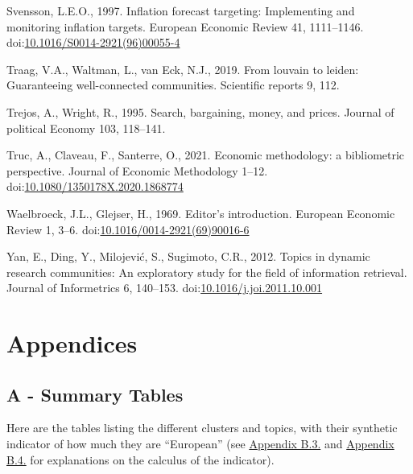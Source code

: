 \documentclass[
  12pt,
  onecolumn]{article}
\newlength{\cslhangindent}
\newlength{\cslentryspacingunit} %
\newenvironment{CSLReferences}[2] %
 {%
  \setlength{\parindent}{0pt}
  \ifodd #1
  \let\oldpar\par
  \def\par{\hangindent=\cslhangindent\oldpar}
  \fi
  \setlength{\parskip}{#2\cslentryspacingunit}
 }%
 {}
\begin{document}
\begin{CSLReferences}{1}{0}
\leavevmode{}%
Svensson, L.E.O., 1997. Inflation forecast targeting: {Implementing} and
monitoring inflation targets. European Economic Review 41, 1111--1146.
doi:\href{https://doi.org/10.1016/S0014-2921(96)00055-4}{10.1016/S0014-2921(96)00055-4}

\leavevmode{}%
Traag, V.A., Waltman, L., van Eck, N.J., 2019. From louvain to leiden:
Guaranteeing well-connected communities. Scientific reports 9, 112.

\leavevmode{}%
Trejos, A., Wright, R., 1995. Search, bargaining, money, and prices.
Journal of political Economy 103, 118--141.

\leavevmode{}%
Truc, A., Claveau, F., Santerre, O., 2021. Economic methodology: a
bibliometric perspective. Journal of Economic Methodology 1--12.
doi:\href{https://doi.org/10.1080/1350178X.2020.1868774}{10.1080/1350178X.2020.1868774}

\leavevmode{}%
Waelbroeck, J.L., Glejser, H., 1969. Editor's introduction. European
Economic Review 1, 3--6.
doi:\href{https://doi.org/10.1016/0014-2921(69)90016-6}{10.1016/0014-2921(69)90016-6}

\leavevmode{}%
Yan, E., Ding, Y., Milojević, S., Sugimoto, C.R., 2012. Topics in
dynamic research communities: {An} exploratory study for the field of
information retrieval. Journal of Informetrics 6, 140--153.
doi:\href{https://doi.org/10.1016/j.joi.2011.10.001}{10.1016/j.joi.2011.10.001}

\end{CSLReferences}

\newpage

\hypertarget{appendices}{%
\section*{Appendices}\label{appendices}}

\hypertarget{a---summary-tables}{%
\subsection*{A - Summary Tables}\label{a---summary-tables}}

Here are the tables listing the different clusters and topics, with
their synthetic indicator of how much they are ``European'' (see
\protect\hyperlink{network}{Appendix B.3.} and
\protect\hyperlink{topic}{Appendix B.4.} for explanations on the
calculus of the indicator).
\end{document}
